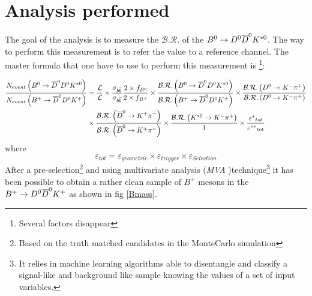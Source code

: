 \documentclass[11pt]{article}
\begin{document}
\section{Analysis performed}
The goal of the analysis is to measure the $\mathcal{B.R.}$ of the  $B^{0} \rightarrow D^0 \overline{D}^{0} K^{\ast 0}$. The way to perform this measurement is to refer the value to a reference channel. The master formula that one have to use to perform this measurement is \footnote{Several factors disappear}:

\tiny \begin{equation}\label{1}
\begin{split} 
\frac { { N }_{ event }\left( B^0\rightarrow \overline{D}^0 D^0 K^{\ast 0} \right)  }{ { N }_{ event }\left( B^+\rightarrow \overline{D}^0 D^0 K^{+} \right)  }&  = \frac{\mathcal{L}}{\mathcal{L}}\times \frac{\sigma_{b\overline{b}}}{\sigma_{b\overline{b}}}   \frac { 2 \times { f }_{ { B }^{ 0 } } }{ 2 \times { f }_{ { B }^{ + } } } \times \frac { \mathcal{B.R.}\left( B^0\rightarrow \overline{D}^0 D^0 K^{\ast 0} \right)  }{ \mathcal{B.R.}\left(B^+\rightarrow \overline{D}^0 D^0 K^{+} \right)  } \times \frac { \mathcal{B.R.}\left( D^{0} \rightarrow K^{-} \pi^{+} \right)  }{ \mathcal{B.R.}\left( D^{0} \rightarrow K^{-} \pi^{+} \right)  }  \\   & \times \frac { \mathcal{B.R.}\left( \overline{D}^0 \rightarrow K^+ \pi^- \right)  }{ \mathcal{B.R.}\left( \overline{D}^0 \rightarrow K^+ \pi^- \right)  } \times \frac { \mathcal{B.R.}\left( K^{\ast 0} \rightarrow K^- \pi^+ \right)  }{ 1 } \times \frac { { \varepsilon ^{\ast} }_{ tot } }{ {  \varepsilon^{\ast \ast} }_{ tot } }
\end{split} 
\end{equation}
\normalsize where 
\tiny \begin{equation} \label{epsilon}
 \varepsilon_{ tot } = \varepsilon_{geometric}\times \varepsilon_{trigger}\times \varepsilon_{Selection}
\end{equation}
\normalsize After a pre-selection\footnote{Based on the truth matched candidates in the MonteCarlo simulation} and using multivariate analysis (\textit{MVA} )technique\footnote{It relies in machine learning algorithms able to disentangle and classify a signal-like and background like sample knowing the values of a set of input variables.} it has been possible to obtain a rather clean sample of $B^{+}$ mesons in the $B^{+} \rightarrow D^0 \overline{D}^{0} K^{+}$ as shown in fig \ref{Bmass}.
\end{document}
